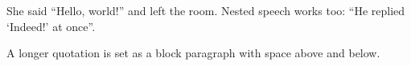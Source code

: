 \documentclass{article}
\begin{document}
She said \enquote{Hello, world!} and left the room.
Nested speech works too: \enquote{He replied \enquote{Indeed!} at once}.
\begin{displayquote}
A longer quotation is set as a block paragraph with space above and below.
\end{displayquote}
\end{document}
